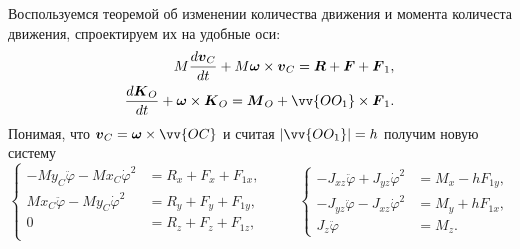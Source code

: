 
Воспользуемся теоремой об изменении количества движения и момента количеста движения, спроектируем их на удобные оси:
\begin{align*}
    M \frac{d \vc{v}_C}{d t} + M \vc{\omega} \times \vc{v}_C = \vc{R} + \vc{F} + \vc{F}_1, \\
    \frac{d \vc{K}_O}{d t} + \vc{\omega} \times \vc{K}_O = \vc{M}_O + \vv{OO_1} \times \vc{F}_1.
\end{align*}
Понимая, что $\vc{v}_C = \vc{\omega} \times \vv{OC}$ и считая $|\vv{OO_1}|=h$ получим новую систему
\begin{equation*}
    \left\{\begin{aligned}
         - M y_C \ddot{\varphi} - M x_C \dot{\varphi}^2 &= R_x + F_x + F_{1x}, \\
         M x_C \ddot{\varphi} - M y_C \dot{\varphi}^2 &= R_y + F_y + F_{1y}, \\
         0 &= R_z + F_z + F_{1z}, \\
     \end{aligned}\right. 
     \hspace{1cm} 
     \left\{\begin{aligned}
         - J_{xz} \ddot{\varphi} + J_{yz} \dot{\varphi}^2 &= M_x - h F_{1y}, \\
         - J_{yz} \ddot{\varphi} - J_{xz} \dot{\varphi}^2 &= M_y + h F_{1x}, \\
         J_z \ddot{\varphi} &= M_z.
     \end{aligned}\right.
\end{equation*}








